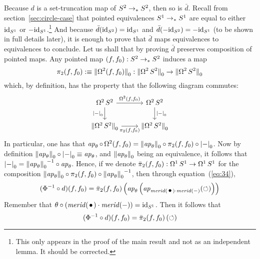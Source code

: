 \documentclass[english,a4]{article}
\begin{document}
Because $d$ is a set-truncation map of ${S^2}\to_\ast{S^2}$, then so is
$\bar d$. Recall from section~\ref{sec:circle-case} that pointed
equivalences ${S^1} \to_\ast {S^1}$ are equal to either $\mathord{\mathrm{id}}_{S^1}$ or
$-\mathord{\mathrm{id}}_{S^1}$.\footnote{\color{red}This only appears in the proof of the
  main result and not as an independent lemma. It should be
  corrected.}  And because $\bar d(\mathord{\mathrm{id}}_{S^2}) = \mathord{\mathrm{id}}_{S^1}$ and
$\bar d(-\mathord{\mathrm{id}}_{S^2}) = -\mathord{\mathrm{id}}_{S^1}$ (to be shown in full details later), it
is enough to prove that $\bar d$ maps equivalences to equivalences to
conclude. Let us shall that by proving $\bar d$ preserves composition
of pointed maps. Any pointed map $(f,f_0): {S^2} \to_\ast {S^2}$ induces a
map
\begin{equation}
  \label{eq:33}
  \pi_2(f,f_0)\mathrel{\hbox{:}\mkern-5mu\equiv} {\lVert\mathop{\Omega^{2}} (f,f_0)\rVert}_0: {\lVert\mathop{\Omega^{2}} {S^2}\rVert}_0 \to {\lVert\mathop{\Omega^{2}} {S^2}\rVert}_0
\end{equation}
which, by definition, has the property that the following diagram
commutes:
\begin{equation}
  \label{eq:35}
  \begin{tikzcd}
    \loopspace 2 \Sp \rar["{\loopspace 2 (f,f_0)}"]
    \dar["\truncset\blank"swap] & \loopspace 2 \Sp
    \dar["\truncset\blank"]
    \\
    \Truncset{\loopspace 2 \Sp} \rar["{\pi_2 (f,f_0)}"swap] & \Truncset{\loopspace 2 \Sp}
  \end{tikzcd}
\end{equation}
In particular, one has that
$\mathop{{\it ap}_{\theta}} \circ \mathop{\Omega^{2}} (f,f_0) = {\lVert\mathop{{\it ap}_{\theta}}\rVert}_0 \circ
\pi_2(f,f_0) \circ {\lvert\mathord{-}\rvert}_0$. Now by definition
${\lVert\mathop{{\it ap}_{\theta}}\rVert}_0 \circ {\lvert\mathord{-}\rvert}_0 \equiv \mathop{{\it ap}_{\theta}}$, and
${\lVert\mathop{{\it ap}_{\theta}}\rVert}_0$ being an equivalence, it follows that
${\lvert\mathord{-}\rvert}_0 = {{\lVert\mathop{{\it ap}_{\theta}}\rVert}_0}^{-1}\circ \mathop{{\it ap}_{\theta}}$. Hence,
if we denote $\bar \pi_2(f,f_0): \mathop{\Omega^{1}} {S^1} \to \mathop{\Omega^{1}} {S^1}$ for the
composition
${\lVert\mathop{{\it ap}_{\theta}}\rVert}_0 \circ \pi_2(f,f_0) \circ
{{\lVert\mathop{{\it ap}_{\theta}}\rVert}_0}^{-1}$, then through equation~(\ref{eq:34}),
\begin{equation}
  \label{eq:36}%
  (\inv\Phi \circ d) (f,f_0) = \bar\pi_2(f,f_0)\left(
    \ap\theta \left( \ap {\mrd(\base) \cdot \mrd(\blank)} (\Sloop) \right)
  \right)
\end{equation}
Remember that $\theta\circ (\mrd(\base)\cdot\mrd(\blank)) =
\id_\Sc$. Then it follows that
\begin{equation}
  \label{eq:36}%
  (\inv\Phi \circ d) (f,f_0) = \bar\pi_2(f,f_0)\left( \Sloop \right)
\end{equation}
\end{document}
